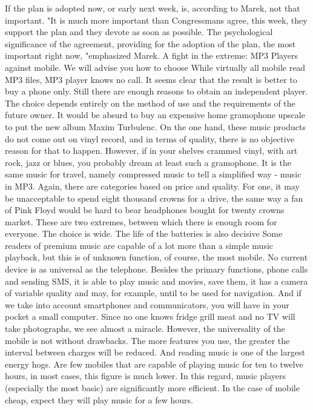 If the plan is adopted now, or early next week, is, according to Marek, not that important.
"It is much more important than Congressmans agree, this week, they support the plan and they devote as soon as possible.
The psychological significance of the agreement, providing for the adoption of the plan, the most important right now, "emphasized Marek.
A fight in the extreme: MP3 Players against mobile.
We will advise you how to choose
While virtually all mobile read MP3 files, MP3 player knows no call.
It seems clear that the result is better to buy a phone only.
Still there are enough reasons to obtain an independent player.
The choice depends entirely on the method of use and the requirements of the future owner.
It would be absurd to buy an expensive home gramophone upscale to put the new album Maxim Turbulenc.
On the one hand, these music products do not come out on vinyl record, and in terms of quality, there is no objective reason for that to happen.
However, if in your shelves crammed vinyl, with art rock, jazz or blues, you probably dream at least such a gramophone.
It is the same music for travel, namely compressed music to tell a simplified way - music in MP3.
Again, there are categories based on price and quality.
For one, it may be unacceptable to spend eight thousand crowns for a drive, the same way a fan of Pink Floyd would be hard to bear headphones bought for twenty crowns market.
These are two extremes, between which there is enough room for everyone.
The choice is wide.
The life of the batteries is also decisive
Some readers of premium music are capable of a lot more than a simple music playback, but this is of unknown function, of course, the most mobile.
No current device is as universal as the telephone.
Besides the primary functions, phone calls and sending SMS, it is able to play music and movies, save them, it has a camera of variable quality and may, for example, until to be used for navigation.
And if we take into account smartphones and communicators, you will have in your pocket a small computer.
Since no one knows fridge grill meat and no TV will take photographs, we see almost a miracle.
However, the universality of the mobile is not without drawbacks.
The more features you use, the greater the interval between charges will be reduced.
And reading music is one of the largest energy hogs.
Are few mobiles that are capable of playing music for ten to twelve hours, in most cases, this figure is much lower.
In this regard, music players (especially the most basic) are significantly more efficient.
In the case of mobile cheap, expect they will play music for a few hours.
